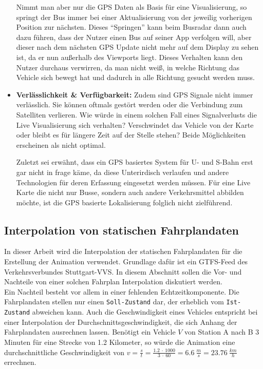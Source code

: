 \begin{newpage}
\begin{itemize}
          Nimmt man aber nur die GPS Daten als Basis für eine Visualisierung, so springt der Bus immer bei einer Aktualisierung von der jeweilig vorherigen Position zur nächsten. Dieses "`Springen"' kann beim Busradar dann auch dazu führen, dass der Nutzer einen Bus auf seiner App verfolgen will, aber dieser nach dem nächsten GPS Update nicht mehr auf dem Display zu sehen ist, da er nun außerhalb des Viewports liegt. Dieses Verhalten kann den Nutzer durchaus verwirren, da man nicht weiß, in welche Richtung das Vehicle sich bewegt hat und dadurch in alle Richtung gesucht werden muss.

        \item \textbf{Verlässlichkeit \& Verfügbarkeit:} 
          Zudem sind GPS Signale nicht immer verlässlich. Sie können oftmals gestört werden oder die Verbindung zum Satelliten verlieren. Wie würde in einem solchen Fall eines Signalverlusts die Live Visualisierung sich verhalten? Verschwindet das Vehicle von der Karte oder bleibt es für längere Zeit auf der Stelle stehen? Beide Möglichkeiten erscheinen als nicht optimal. 

          Zuletzt sei erwähnt, dass ein GPS basiertes System für U- und S-Bahn erst gar nicht in frage käme, da diese Unterirdisch verlaufen und andere Technologien für deren Erfassung eingesetzt werden müssen. Für eine Live Karte die nicht nur Busse, sondern auch andere Verkehrsmittel abbilden möchte, ist die GPS basierte Lokalisierung folglich nicht zielführend.
      \end{itemize} 


      \subsection{Interpolation von statischen Fahrplandaten}
      \label{sub:interpolation_von_statischen_fahrplandaten}
        In dieser Arbeit wird die Interpolation der statischen Fahrplandaten für die Erstellung der Animation verwendet. Grundlage dafür ist ein GTFS-Feed des Verkehrsverbundes Stuttgart-VVS.
        In diesem Abschnitt sollen die Vor- und Nachteile von einer solchen  Fahrplan Interpolation diskutiert werden.\\

        Ein Nachteil besteht vor allem in einer fehlenden Echtzeitkomponente. Die Fahrplandaten stellen nur einen \texttt{Soll-Zustand} dar, der erheblich vom \texttt{Ist-Zustand} abweichen kann. Auch die Geschwindigkeit eines Vehicles entspricht bei einer Interpolation der Durchschnittsgeschwindigkeit, die sich Anhang der Fahrplandaten ausrechnen lassen. Benötigt ein Vehicle $V$ von Station A nach B 3 Minuten für eine Strecke von 1.2 Kilometer, so würde die Animation eine durchschnittliche Geschwindigkeit von $v = \frac{s}{t} = \frac{1.2 \: \cdot \: 1000}{3 \: \cdot \: 60} = 6.6 \: \frac{m}{s} = 23.76 \: \frac{km}{h}$ errechnen.


\end{newpage}
